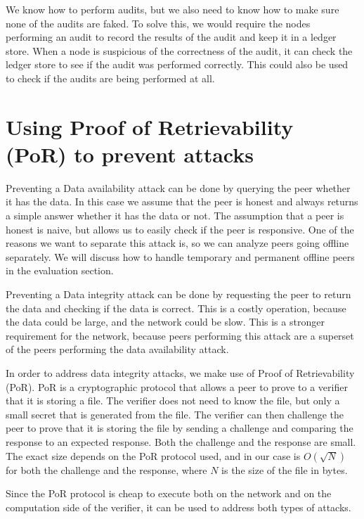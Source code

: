 We know how to perform audits, but we also need to know how to make sure none of the
audits are faked.
To solve this, we would require the nodes performing an audit to record the results of the audit and keep
it in a ledger store.
When a node is suspicious of the correctness of the audit, it can check the ledger store to see if the audit
was performed correctly.
This could also be used to check if the audits are being performed at all.

\section{Using Proof of Retrievability (PoR) to prevent attacks}

Preventing a Data availability attack can be done by querying the peer whether it has the data.
In this case we assume that the peer is honest and always returns a simple answer whether it has the data or not.
The assumption that a peer is honest is naive, but allows us to easily check if the peer is responsive.
One of the reasons we want to separate this attack is, so we can analyze peers going offline separately.
We will discuss how to handle temporary and permanent offline peers in the evaluation section.

Preventing a Data integrity attack can be done by requesting the peer to return the data and checking if
the data is correct.
This is a costly operation, because the data could be large, and the network could be slow.
This is a stronger requirement for the network, because peers performing this attack are a superset
of the peers performing the data availability attack.

In order to address data integrity attacks, we make use of Proof of Retrievability (PoR).
PoR is a cryptographic protocol that allows a peer to prove to a verifier that it is storing a file.
The verifier does not need to know the file, but only a small secret that is generated from the file.
The verifier can then challenge the peer to prove that it is storing the file by sending a challenge and
comparing the response to an expected response.
Both the challenge and the response are small.
The exact size depends on the PoR protocol used, and in our case is $O(\sqrt{N})$ \cite{poralgebra} for
both the challenge and the response, where $N$ is the size of the file in bytes.

Since the PoR protocol is cheap to execute both on the network and on the computation side of the verifier,
it can be used to address both types of attacks.

